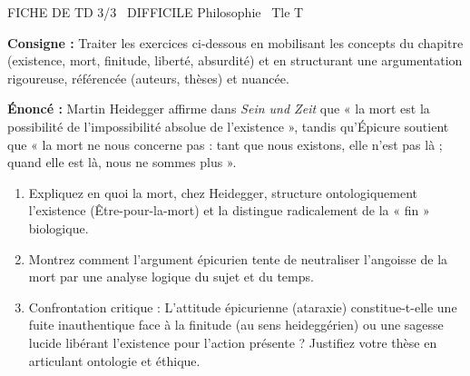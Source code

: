 \documentclass[11pt]{article}
\begin{document}
\begin{tcolorbox}[enhanced,colback=popink,colframe=popink,arc=10pt,boxrule=0pt,left=12pt,right=12pt,top=9pt,bottom=9pt]
{\color{white}\popxbold\small FICHE DE TD 3/3 \textbullet\ DIFFICILE \hfill Philosophie \textbullet\ Tle T\par}
\end{tcolorbox}
\vspace{4pt}
\noindent \textbf{Consigne :} Traiter les exercices ci-dessous en mobilisant les concepts du chapitre (existence, mort, finitude, liberté, absurdité) et en structurant une argumentation rigoureuse, référencée (auteurs, thèses) et nuancée.

\begin{exercice}
\textbf{Énoncé :} Martin Heidegger affirme dans \textit{Sein und Zeit} que « la mort est la possibilité de l'impossibilité absolue de l'existence », tandis qu'Épicure soutient que « la mort ne nous concerne pas : tant que nous existons, elle n'est pas là ; quand elle est là, nous ne sommes plus ». 
\begin{enumerate}
    \item[2 pts] Expliquez en quoi la mort, chez Heidegger, structure ontologiquement l'existence (Être-pour-la-mort) et la distingue radicalement de la « fin » biologique. 
    \item[2 pts] Montrez comment l'argument épicurien tente de neutraliser l'angoisse de la mort par une analyse logique du sujet et du temps. 
    \item[3 pts] Confrontation critique : L'attitude épicurienne (ataraxie) constitue-t-elle une fuite inauthentique face à la finitude (au sens heideggérien) ou une sagesse lucide libérant l'existence pour l'action présente ? Justifiez votre thèse en articulant ontologie et éthique.
\end{enumerate}
\end{exercice}
\end{document}
